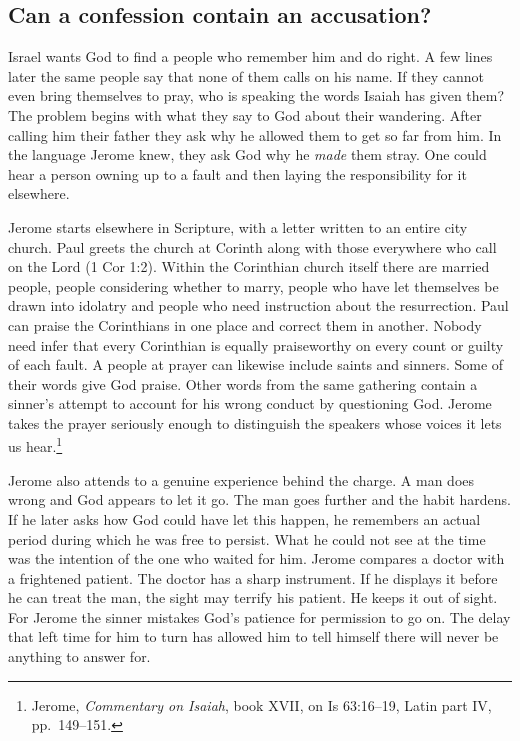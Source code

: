 
\subsection{Can a confession contain an accusation?}

Israel wants God to find a people who remember him and do right. A few lines later the same people say that none of them calls on his name. If they cannot even bring themselves to pray, who is speaking the words Isaiah has given them? The problem begins with what they say to God about their wandering. After calling him their father they ask why he allowed them to get so far from him. In the language Jerome knew, they ask God why he \emph{made} them stray. One could hear a person owning up to a fault and then laying the responsibility for it elsewhere.

Jerome starts elsewhere in Scripture, with a letter written to an entire city church. Paul greets the church at Corinth along with those everywhere who call on the Lord (1 Cor 1:2). Within the Corinthian church itself there are married people, people considering whether to marry, people who have let themselves be drawn into idolatry and people who need instruction about the resurrection. Paul can praise the Corinthians in one place and correct them in another. Nobody need infer that every Corinthian is equally praiseworthy on every count or guilty of each fault. A people at prayer can likewise include saints and sinners. Some of their words give God praise. Other words from the same gathering contain a sinner's attempt to account for his wrong conduct by questioning God. Jerome takes the prayer seriously enough to distinguish the speakers whose voices it lets us hear.\footnote{Jerome, \textit{Commentary on Isaiah}, book XVII, on Is 63:16--19, Latin part IV, pp.~149--151.}

Jerome also attends to a genuine experience behind the charge. A man does wrong and God appears to let it go. The man goes further and the habit hardens. If he later asks how God could have let this happen, he remembers an actual period during which he was free to persist. What he could not see at the time was the intention of the one who waited for him. Jerome compares a doctor with a frightened patient. The doctor has a sharp instrument. If he displays it before he can treat the man, the sight may terrify his patient. He keeps it out of sight. For Jerome the sinner mistakes God's patience for permission to go on. The delay that left time for him to turn has allowed him to tell himself there will never be anything to answer for.

